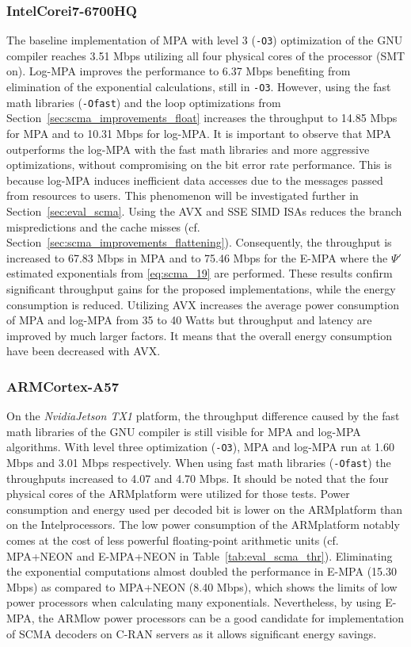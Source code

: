 \subsubsection{Intel\R Core\TM i7-6700HQ}

The baseline implementation of MPA with level 3 (\verb|-O3|) optimization of the
GNU compiler reaches 3.51 Mbps utilizing all four physical cores of the
processor (SMT on). Log-MPA improves the performance to 6.37 Mbps benefiting
from elimination of the exponential calculations, still in \verb|-O3|. However,
using the fast math libraries (\verb|-Ofast|) and the loop optimizations from
Section~\ref{sec:scma_improvements_float} increases the throughput to 14.85 Mbps
for MPA and to 10.31 Mbps for log-MPA. It is important to observe that MPA
outperforms the log-MPA with the fast math libraries and more aggressive
optimizations, without compromising on the bit error rate performance. This is
because log-MPA induces inefficient data accesses due to the messages passed
from resources to users. This phenomenon will be investigated further in
Section~\ref{sec:eval_scma}. Using the AVX and SSE SIMD ISAs reduces the
branch mispredictions and the cache misses (cf.
Section~\ref{sec:scma_improvements_flattening}). Consequently, the throughput is
increased to 67.83 Mbps in MPA and to 75.46 Mbps for the E-MPA where the $\Psi'$
estimated exponentials from \eqref{eq:scma_19} are performed. These results
confirm significant throughput gains for the proposed implementations, while the
energy consumption is reduced. Utilizing AVX increases the average power
consumption of MPA and log-MPA from 35 to 40 Watts but throughput and latency
are improved by much larger factors. It means that the overall energy
consumption have been decreased with AVX.

\subsubsection{ARM\R Cortex-A57}

On the \emph{Nvidia\R Jetson TX1} platform, the throughput difference caused by
the fast math libraries of the GNU compiler is still visible for MPA and log-MPA
algorithms. With level three optimization (\verb|-O3|), MPA and log-MPA run at
1.60 Mbps and 3.01 Mbps respectively. When using fast math libraries
(\verb|-Ofast|) the throughputs increased to 4.07 and 4.70 Mbps. It should be
noted that the four physical cores of the ARM\R platform were  utilized for
those tests. Power consumption and energy used per decoded bit is lower on the
ARM\R platform than on the Intel\R processors. The low power consumption of the
ARM\R platform notably comes at the cost of less powerful floating-point
arithmetic units (cf. MPA+NEON and E-MPA+NEON in Table~\ref{tab:eval_scma_thr}).
Eliminating the exponential computations almost doubled the performance in E-MPA
(15.30 Mbps) as compared to MPA+NEON (8.40 Mbps), which shows the limits of low
power processors when calculating many exponentials. Nevertheless, by using
E-MPA, the ARM\R low power processors can be a good candidate for implementation
of SCMA decoders on C-RAN servers as it allows significant energy savings.

